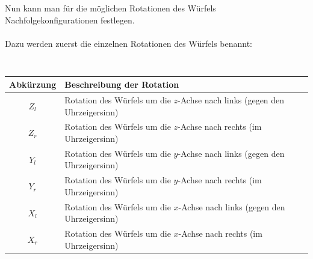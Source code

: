 \documentclass[12pt,a4paper, usenames, dvipsnames]{article}
\begin{document}
\ \\ 
\\
Nun kann man für die möglichen Rotationen des Würfels Nachfolgekonfigurationen festlegen. \\
\\
Dazu werden zuerst die einzelnen Rotationen des Würfels benannt: \\
\\
\begin{table}[H]

\begin{tabular}{|c|l|}
\hline
Abkürzung & Beschreibung der Rotation \\
\hline
\hline
$Z_l$ & Rotation des Würfels um die $z$-Achse nach links (gegen den Uhrzeigersinn)\\
\hline
$Z_r$ & Rotation des Würfels um die $z$-Achse nach rechts (im Uhrzeigersinn)  \\
\hline
$Y_l$ & Rotation des Würfels um die $y$-Achse nach links (gegen den Uhrzeigersinn)\\
\hline
$Y_r$ & Rotation des Würfels um die $y$-Achse nach rechts (im Uhrzeigersinn)  \\
\hline
$X_l$ & Rotation des Würfels um die $x$-Achse nach links (gegen den Uhrzeigersinn)\\
\hline
$X_r$ & Rotation des Würfels um die $x$-Achse nach rechts (im Uhrzeigersinn) \\
\hline
\end{tabular} 
\caption[Rotationen des Würfels]{}
\end{table}
\end{document}
